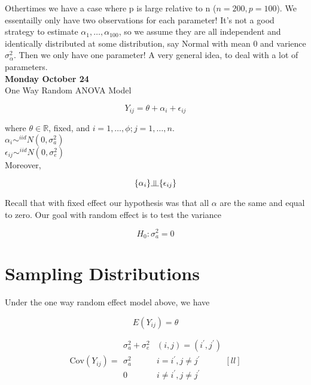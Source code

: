 \documentclass[11pt,fleqn]{book} %
\newcommand{\indep}{\rotatebox[origin=c]{90}{$\models$}}
\begin{document}
Othertimes we have a case where p is large relative to n ($n = 200, p = 100$). We essentailly only have two observations for each parameter! It's not a good strategy to estimate $\alpha_1, \dots, \alpha_{100}$, so we assume they are all independent and identically distributed at some distribution, say Normal with mean 0 and varience $\sigma^2_\alpha$. Then we only have one parameter! A very general idea, to deal with a lot of parameters. \\

\textbf{Monday October 24}\\

One Way Random ANOVA Model

		$$Y_{ij} = \theta + \alpha_i + \epsilon_{ij} $$

where $\theta \in \mathbb{R}$, fixed, and $i = 1, \dots, \phi; j = 1, \dots, n$.\\

$\alpha_i \sim^{iid} N(0, \sigma_a^2)$\\

$\epsilon_{ij} \sim^{iid} N(0, \sigma_e^2)$\\


Moreover, 
		
		$$\{\alpha_i\} \indep \{\epsilon_{ij}\} $$


Recall that with fixed effect our hypothesis was that all $\alpha$ are the same and equal to zero. Our goal with random effect is to test the variance

		$$H_0: \sigma^2_a = 0 $$


\section{Sampling Distributions}


\begin{theorem}
	Under the one way random effect model above, we have 

			$$E(Y_{ij}) = \theta $$

			$$\text{Cov}(Y_{ij}) =  \begin{array}{ll}
				\sigma^2_a + \sigma^2_e  & (i,j) = (i^\prime, j^\prime)\\
				\sigma^2_a & i = i^\prime, j \neq j^\prime\\
				0 & i \neq i^\prime, j \neq j^\prime\\
			\end{array}[ll] $$
\end{theorem}
\end{document}
